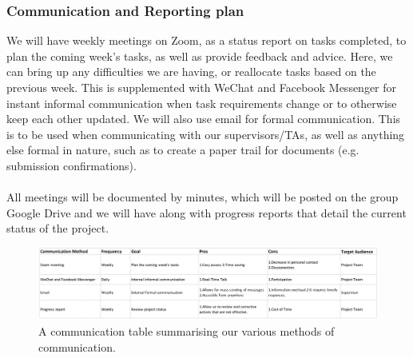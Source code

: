 \documentclass[a4paper, 12pt]{article}
\begin{document}
        \subsubsection{Communication and Reporting plan}
        We will have weekly meetings on Zoom, as a status report on tasks completed, to plan the coming week's tasks, as well as provide feedback and advice. Here, we can bring up any difficulties we are having, or reallocate tasks based on the previous week.
        This is supplemented with WeChat and Facebook Messenger for instant informal communication when task requirements change or to otherwise keep each other updated. 
        We will also use email for formal communication. This is to be used when communicating with our supervisors/TAs, as well as anything else formal in nature, such as to create a paper trail for documents (e.g. submission confirmations).
        \\\\
        All meetings will be documented by minutes, which will be posted on the group Google Drive and we will have along with progress reports that detail the current status of the project.
\begin{figure}[ht]
    \centering
    \includegraphics[width=1\textwidth]{Communication Table.png}
    \caption{A communication table summarising our various methods of communication.}
    \label{fig:model_summary}
\end{figure}
        
\end{document}
